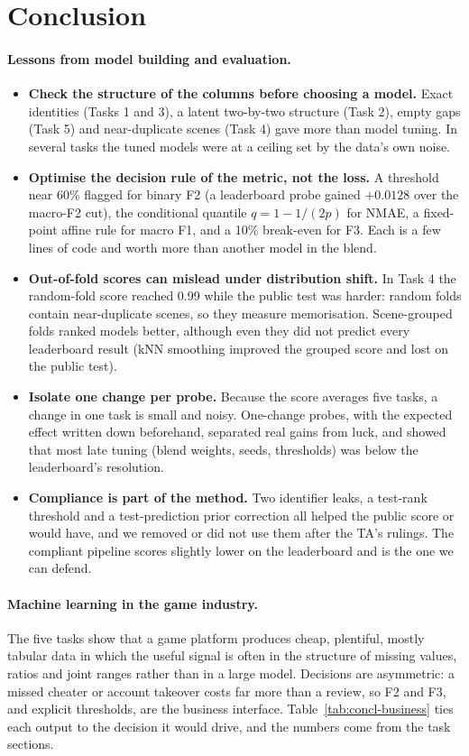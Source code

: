 \section{Conclusion}
\label{sec:conclusion}

\paragraph{Lessons from model building and evaluation.}
\begin{itemize}[leftmargin=*,itemsep=3pt]
\item \textbf{Check the structure of the columns before choosing a model.} Exact identities (Tasks 1 and 3), a latent two-by-two structure (Task 2), empty gaps (Task 5) and near-duplicate scenes (Task 4) gave more than model tuning. In several tasks the tuned models were at a ceiling set by the data's own noise.
\item \textbf{Optimise the decision rule of the metric, not the loss.} A threshold near 60\% flagged for binary F2 (a leaderboard probe gained $+0.0128$ over the macro-F2 cut), the conditional quantile $q=1-1/(2p)$ for NMAE, a fixed-point affine rule for macro F1, and a 10\% break-even for F3. Each is a few lines of code and worth more than another model in the blend.
\item \textbf{Out-of-fold scores can mislead under distribution shift.} In Task 4 the random-fold score reached 0.99 while the public test was harder: random folds contain near-duplicate scenes, so they measure memorisation. Scene-grouped folds ranked models better, although even they did not predict every leaderboard result (kNN smoothing improved the grouped score and lost on the public test).
\item \textbf{Isolate one change per probe.} Because the score averages five tasks, a change in one task is small and noisy. One-change probes, with the expected effect written down beforehand, separated real gains from luck, and showed that most late tuning (blend weights, seeds, thresholds) was below the leaderboard's resolution.
\item \textbf{Compliance is part of the method.} Two identifier leaks, a test-rank threshold and a test-prediction prior correction all helped the public score or would have, and we removed or did not use them after the TA's rulings. The compliant pipeline scores slightly lower on the leaderboard and is the one we can defend.
\end{itemize}

\paragraph{Machine learning in the game industry.} The five tasks show that a game platform produces cheap, plentiful, mostly tabular data in which the useful signal is often in the structure of missing values, ratios and joint ranges rather than in a large model. Decisions are asymmetric: a missed cheater or account takeover costs far more than a review, so F2 and F3, and explicit thresholds, are the business interface. Table~\ref{tab:concl-business} ties each output to the decision it would drive, and the numbers come from the task sections.

